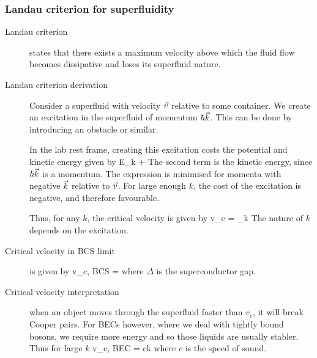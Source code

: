 \subsubsection{Landau criterion for superfluidity}
\begin{description}

\item[Landau criterion] states that there exists a maximum velocity above which the fluid flow becomes dissipative and loses its superfluid nature. 

\item[Landau criterion derivation] Consider a superfluid with velocity $\vec{v}$ relative to some container. We create an excitation in the superfluid of momentum $\hbar \vec{k}$. This can be done by introducing an obstacle or similar. 

In the lab rest frame, creating this excitation costs the potential and kinetic energy given by 
\beq
E_k + \hbar {} \cdot {}
\eeq
The second term is the kinetic energy, since $\hbar \vec{k}$ is a momentum. The expression is minimised for momenta with negative $\vec{k}$ relative to $\vec{v}$. For large enough $k$, the cost of the excitation is negative, and therefore favourable. 

Thus, for any $k$, the critical velocity is given by 
\beq
v_c = \min_{k} 
\eeq
The nature of $k$ depends on the excitation. 

\item[Critical velocity in BCS limit] is given by
\beq
v_{c, BCS} = 
\eeq
where $\Delta$ is the superconductor gap. 

\item[Critical velocity interpretation] when an object moves through the superfluid faster than $v_c$, it will break Cooper pairs. For BECs however, where we deal with tightly bound bosons, we require more energy and so those liquids are usually stabler. Thus for large $k$
\beq
v_{c, BEC} = ck
\eeq
where $c$ is the speed of sound. 

\end{description}
